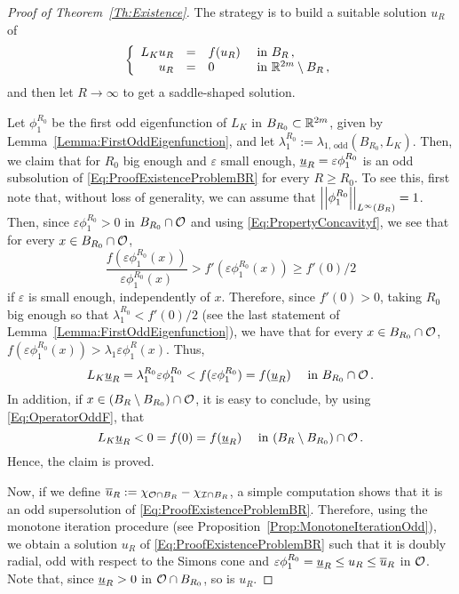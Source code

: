 \begin{proof}[Proof of Theorem~\ref{Th:Existence}]
	The strategy is to build a suitable solution $u_R$ of 
	\begin{equation}
	\label{Eq:ProofExistenceProblemBR}
	\left\{\begin{array}{rcll}
	L_K u_R &=& f(u_R) & \textrm{ in } B_R\,,\\
	u_R &=& 0 & \textrm{ in }\mathbb{R}^{2m} \setminus B_R\,,
	\end{array} \right.
	\end{equation}
	and then let $R\to \infty$ to get a saddle-shaped solution.
	
	Let $\phi_1^{R_0}$ be the first odd eigenfunction of $L_K$ in $B_{R_0} \subset \mathbb{R}^{2m}$, given by Lemma~\ref{Lemma:FirstOddEigenfunction}, and let  $\lambda_1^{R_0} := \lambda_{1, \, \mathrm{odd}}(B_{R_0}, L_K)$. Then, we claim that for $R_0$ big enough and $\varepsilon$ small enough, $\underline{u}_R = \varepsilon\phi_1^{R_0} $ is an odd subsolution of \eqref{Eq:ProofExistenceProblemBR} for every $R\geq R_0$. To see this, first note that, without loss of generality, we can assume that $\left | \left |{\phi_1^{R_0}} \right | \right |_{L^\infty(B_R)}=1$. Then, since $\varepsilon \phi_1^{R_0}>0$ in $B_{R_0}\cap \mathcal{O}$ and using \eqref{Eq:PropertyConcavityf}, we see that for every $x\in B_{R_0}\cap \mathcal{O}$,
	$$
	\dfrac{f(\varepsilon \phi_1^{R_0}(x))}{\varepsilon \phi_1^{R_0}(x)} > f'(\varepsilon \phi_1^{R_0}(x)) \geq f'(0)/2
	$$
	if $\varepsilon$ is small enough, independently of $x$. Therefore, since $f'(0)>0$, taking $R_0$ big enough so that $\lambda_1^{R_0} < f'(0)/2$ (see the last statement of Lemma~\ref{Lemma:FirstOddEigenfunction}), we have that for every $x\in B_{R_0}\cap \mathcal{O}$,  $f(\varepsilon \phi_1^{R_0}(x)) > \lambda_1 \varepsilon \phi_1^R(x)$. Thus,
	$$
	L_K \underline{u}_R = \lambda_1^{R_0} \varepsilon \phi_1^{R_0} < f(\varepsilon\phi_1^{R_0}) = f(\underline{u}_R) \quad \textrm{ in } B_{R_0}\cap \mathcal{O}\,.
	$$
	In addition, if $x\in (B_R\setminus B_{R_0})\cap\mathcal{O}$, it is easy to conclude, by using \eqref{Eq:OperatorOddF}, that
	$$
	L_K \underline{u}_R < 0 = f(0) =  f(\underline{u}_R) \quad \textrm{ in } (B_R\setminus B_{R_0})\cap \mathcal{O}\,.
	$$
	Hence, the claim is proved.
	
	Now, if we define $\overline{u}_R := \chi_{\mathcal{O} \cap B_R} - \chi_{\mathcal{I} \cap B_R}$, a simple computation shows that it is an odd supersolution of \eqref{Eq:ProofExistenceProblemBR}. Therefore, using the monotone iteration procedure (see Proposition~\ref{Prop:MonotoneIterationOdd}), we obtain a solution $u_R$ of \eqref{Eq:ProofExistenceProblemBR} such that it is doubly radial, odd with respect to the Simons cone and $\varepsilon \phi_1^{R_0} = \underline{u}_R \leq u_R \leq \overline{u}_R$ in $\mathcal{O}$. Note that, since $\underline{u}_R > 0$ in $\mathcal{O} \cap B_{R_0}$, so is $u_R$.
	

\end{proof}
